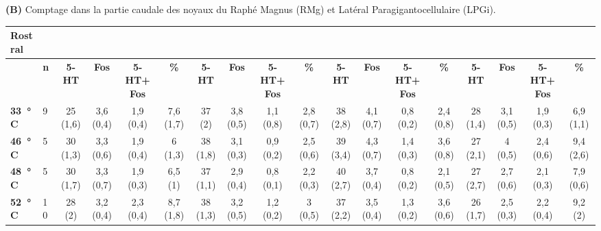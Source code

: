 {{\protect\parbox[t]{25cm}{\singlespacing
\begin{small}
\textbf{(B)} Comptage dans la partie caudale des noyaux du Raphé Magnus (RMg) et Latéral Paragigantocellulaire (LPGi).
\end{small}}}
\begin{scriptsize}
\begin{center}
\begin{tabular}[c]{||BBc|c|c|c|c|c|c|c|c|c|c|c|c|c|c|c||}\hline\hline
Rostral		&  		&  					&  						& 					& \\\hline
 		& \textbf{n} 	& \textbf{5-HT} & \textbf{Fos} 	& \textbf{5-HT+Fos} 	& \textbf{\%} 	& \textbf{5-HT} & \textbf{Fos} 	& \textbf{5-HT+Fos} 	& \textbf{\%} 		& \textbf{5-HT} & \textbf{Fos} 	& \textbf{5-HT+Fos} 	& \textbf{\%} 	& \textbf{5-HT} & \textbf{Fos}    & \textbf{5-HT+Fos}	& \textbf{\%}	\\\hline
\textbf{33~°C} 	& 9 		& 25 (1,6) 	& 3,6 (0,4)	& 1,9 (0,4)		& 7,6 (1,7)	& 37 (2) 	& 3,8 (0,5) 	& 1,1 (0,8) 		& 2,8 (0,7) 		& 38 (2,8) 	& 4,1 (0,7) 	& 0,8 (0,2) 		& 2,4 (0,8) 	& 28 (1,4) 	& 3,1 (0,5) 	  & 1,9 (0,3)		& 6,9 (1,1)	\\\hline
\textbf{46~°C} 	& 5 		& 30 (1,3) 	& 3,3 (0,6) 	& 1,9 (0,4)		& 6 (1,3)	& 38 (1,8) 	& 3,1 (0,3) 	& 0,9 (0,2) 		& 2,5 (0,6) 		& 39 (3,4) 	& 4,3 (0,7) 	& 1,4 (0,3) 		& 3,6 (0,8)	& 27 (2,1) 	& 4 (0,5) 	  & 2,4 (0,6) 		& 9,4 (2,6)	\\\hline
\textbf{48~°C} 	& 5 		& 30 (1,7) 	& 3,3 (0,7)	& 1,9 (0,3) 		& 6,5 (1) 	& 37 (1,1) 	& 2,9 (0,4) 	& 0,8 (0,1)		& 2,2 (0,3) 		& 40 (2,7) 	& 3,7 (0,4) 	& 0,8 (0,2) 		& 2,1 (0,5) 	& 27 (2,7) 	&  2,7 (0,6)	  &  2,1 (0,3)		&  7,9 (0,6) 	\\\hline
\textbf{52~°C} 	& 10 		& 28 (2) 	& 3,2 (0,4) 	& 2,3 (0,4) 		& 8,7 (1,8) 	& 38 (1,3) 	& 3,2 (0,5) 	&  1,2 (0,2) 		&  3 (0,5)  		& 37 (2,2) 	& 3,5 (0,4) 	&  1,3 (0,2)  		&  3,6 (0,6)  	& 26 (1,7)   	&  2,5 (0,3)   	  &  2,2 (0,4) 	  	&  9,2 (2)	\\\hline\hline
\end{tabular}
\end{center}
\end{scriptsize}

}
